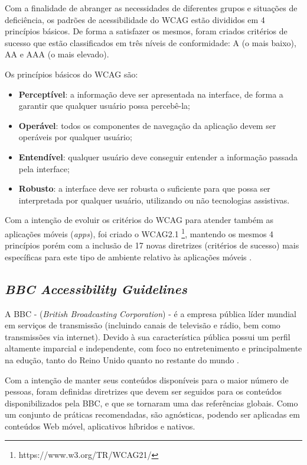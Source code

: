 Com a finalidade de abranger as necessidades de diferentes grupos e situações de deficiência, os padrões de acessibilidade do WCAG estão divididos em 4 princípios básicos. De forma a satisfazer os mesmos, foram criados critérios de sucesso que estão classificados em três níveis de conformidade: A (o mais baixo), AA e AAA (o mais elevado).

Os princípios básicos do WCAG são:

\begin{itemize}
	\item \textbf{Perceptível}: a informação deve ser apresentada na interface, de forma a garantir que qualquer usuário possa percebê-la;
	\item \textbf{Operável}: todos os componentes de navegação da aplicação devem ser operáveis por qualquer usuário;
	\item \textbf{Entendível}: qualquer usuário deve conseguir entender a informação passada pela interface;
	\item \textbf{Robusto}: a interface deve ser robusta o suficiente para que possa ser interpretada por qualquer usuário, utilizando ou não tecnologias assistivas.
\end{itemize}

Com a intenção de evoluir os critérios do WCAG para atender também as aplicações móveis (\textit{apps}), foi criado o WCAG2.1 \footnote{https://www.w3.org/TR/WCAG21/}, mantendo os mesmos 4 princípios porém com a inclusão de 17 novas diretrizes (critérios de sucesso) mais específicas para este tipo de ambiente relativo às aplicações móveis \cite{shanley}.


\subsection{\textit{BBC Accessibility Guidelines}}
A BBC - (\textit{British Broadcasting Corporation}) \cite{bbc} - é a empresa pública líder mundial em serviços de transmissão (incluindo canais de televisão e rádio, bem como transmissões via internet). Devido à sua característica pública possui um perfil altamente imparcial e independente, com foco no entretenimento e principalmente na edução, tanto do Reino Unido quanto no restante do mundo \cite{bbchomepage}.

Com a intenção de manter seus conteúdos disponíveis para o maior número de pessoas, foram definidas diretrizes que devem ser seguidos para os conteúdos disponibilizados pela BBC, e que se tornaram uma das referências globais. Como um conjunto de práticas recomendadas, são agnósticas, podendo ser aplicadas em conteúdos Web móvel, aplicativos híbridos e nativos.

